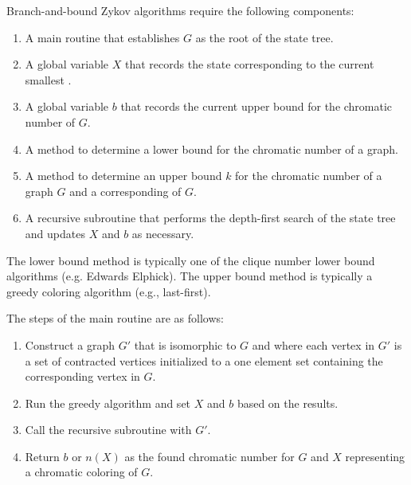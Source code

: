 Branch-and-bound Zykov algorithms require the following components:
\begin{enumerate}
\item A main routine that establishes \(G\) as the root of the state tree.
\item A global variable \(X\) that records the state corresponding to the current smallest .
\item A global variable \(b\) that records the current upper bound for the chromatic number of \(G\).
\item A method to determine a lower bound for the chromatic number of a graph.
\item A method to determine an upper bound \(k\) for the chromatic number of a graph \(G\) and a corresponding
   of \(G\).
\item A recursive subroutine that performs the depth-first search of the state tree and updates \(X\) and \(b\) as
  necessary.
\end{enumerate}

The lower bound method is typically one of the clique number lower bound algorithms (e.g. Edwards Elphick).  The
upper bound method is typically a greedy coloring algorithm (e.g., last-first).

The steps of the main routine are as follows:
\begin{enumerate}
\item Construct a graph \(G'\) that is isomorphic to \(G\) and where each vertex in \(G'\) is a set of contracted
  vertices initialized to a one element set containing the corresponding vertex in \(G\).
\item Run the greedy algorithm and set \(X\) and \(b\) based on the results.
\item Call the recursive subroutine with \(G'\).
\item Return \(b\) or \(n(X)\) as the found chromatic number for \(G\) and \(X\) representing a chromatic coloring
  of \(G\).
\end{enumerate}

